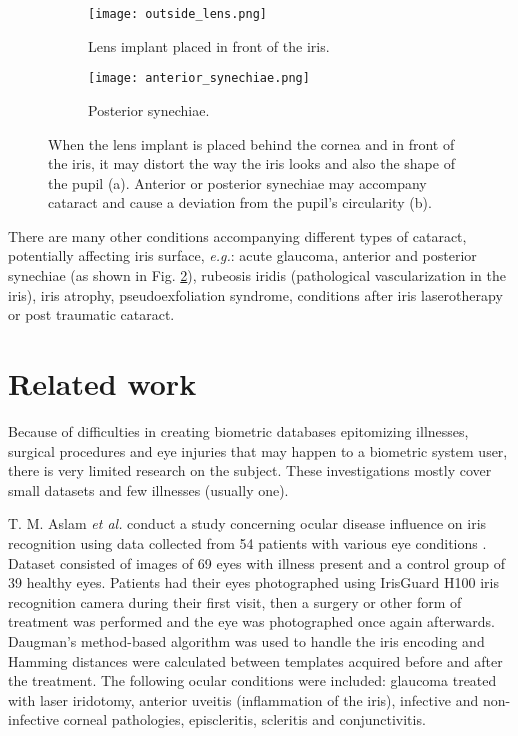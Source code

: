 \documentclass[a4paper]{spie}
\begin{document}
\begin{figure}
\centering
\begin{subfigure}{0.5\textwidth}
  \centering
  \texttt{[image: outside\_lens.png]}
  \caption[outside_lens]
  { \label{outside_lens} 
  Lens implant placed in front of the iris.}
\end{subfigure}%
\begin{subfigure}{0.5\textwidth}
  \centering
  \texttt{[image: anterior\_synechiae.png]}
  \caption[anterior_synechiae]
  {\label{anterior_synechiae}
  Posterior synechiae.}
\end{subfigure}
\vskip0.2cm
\caption{When the lens implant is placed behind the cornea and in front of the iris, it may distort the way the iris looks and also the shape of the pupil (a). Anterior or posterior synechiae may accompany cataract and cause a deviation from the pupil's circularity (b).}
\label{cataract_accompanying}
\end{figure}

There are many other conditions accompanying different types of cataract, potentially affecting iris surface, \emph{e.g.}: acute glaucoma, anterior and posterior synechiae (as shown in Fig. \ref{anterior_synechiae}), rubeosis iridis (pathological vascularization in the iris), iris atrophy, pseudoexfoliation syndrome, conditions after iris laserotherapy or post traumatic cataract.

\section{Related work}
Because of difficulties in creating biometric databases epitomizing illnesses, surgical procedures and eye injuries that may happen to a biometric system user, there is very limited research on the subject. These investigations mostly cover small datasets and few illnesses (usually one).

T. M. Aslam \emph{et al.} conduct a study concerning ocular disease influence on iris recognition using data collected from 54 patients with various eye conditions \cite{Aslam}. Dataset consisted of images of 69 eyes with illness present and a control group of 39 healthy eyes. Patients had their eyes photographed using IrisGuard H100 iris recognition camera during their first visit, then a surgery or other form of treatment was performed and the eye was photographed once again afterwards. Daugman's method-based algorithm was used to handle the iris encoding and Hamming distances were calculated between templates acquired before and after the treatment. The following ocular conditions were included: glaucoma treated with laser iridotomy, anterior uveitis (inflammation of the iris), infective and non-infective corneal pathologies, episcleritis, scleritis and conjunctivitis. 
\end{document}
